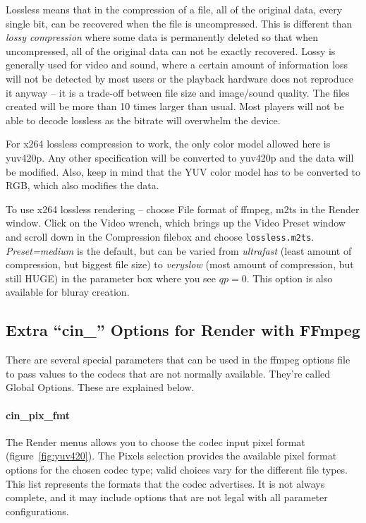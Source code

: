 Lossless means that in the compression of a file, all of the original data, every single bit, can be recovered when the file is uncompressed.  This is different than \textit{lossy compression} where some data is permanently deleted so that when uncompressed, all of the original data can not be exactly recovered.  Lossy is generally used for video and sound, where a certain amount of information loss will not be detected by most users or the playback hardware does not reproduce it anyway -- it is a trade-off between file size and image/sound quality.  The files created will be more than 10 times larger than usual.  Most players will not be able to decode lossless as the bitrate will overwhelm the device.

For x264 lossless compression to work, the only color model allowed here is yuv420p.  Any other specification will be converted to yuv420p and the data will be modified.  Also, keep in mind that the YUV color model has to be converted to RGB, which also modifies the data.

To use x264 lossless rendering -- choose File format of ffmpeg, m2ts in the Render window.  Click on the Video wrench, which brings up the Video Preset window and scroll down in the Compression filebox and choose \texttt{lossless.m2ts}.  \textit{Preset=medium} is the default, but can be varied from \textit{ultrafast} (least amount of compression, but biggest file size) to \textit{veryslow} (most amount of compression, but still HUGE) in the parameter box where you see $qp=0$.  This option is also available for bluray creation.

\subsection{Extra “cin\_” Options for Render with FFmpeg}%
\label{sub:extra_cin_option_ffmpeg}

There are several special parameters that can be used in the ffmpeg options file to pass values to the codecs that are not normally available.  They're called Global Options. These are explained below.

\paragraph{cin\_pix\_fmt} The Render menus allows you to choose the codec input pixel format (figure~\ref{fig:yuv420}).  The Pixels selection provides the available pixel format options for the chosen codec type; valid choices vary for the different file types.  This list represents the formats that the codec advertises.  It is not always complete, and it may include options that are not legal with all parameter configurations.

